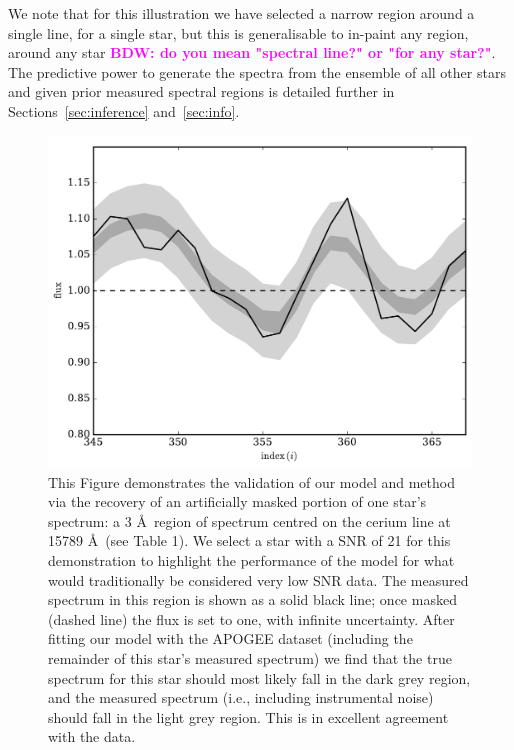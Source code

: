 \documentclass[a4paper,fleqn,usenatbib]{mnras}
\newcommand{\bdw}[1]{\textbf{\textcolor{magenta}{BDW: #1}}}
\begin{document}
We note that for this illustration we have selected a narrow region around a single line, for a single star, but this is generalisable to in-paint any region, around any star \bdw{do you mean "spectral line?" or "for any star?"}. The predictive power to generate the spectra from the ensemble of all other stars and given prior measured spectral regions is detailed further in Sections~\ref{sec:inference} and~\ref{sec:info}. 


\begin{figure}
	\includegraphics[width=\columnwidth]{apogee_centers_final_29502_spc_rec_test_recovery_zoom.pdf}
    \caption{This Figure demonstrates the validation of our model and method via the recovery of an artificially masked portion of one star's spectrum: a 3 \AA\ region of spectrum centred on the cerium line at 15789 \AA\ (see Table 1). We select a star with a SNR of 21 for this demonstration to highlight the performance of the model for what would traditionally be considered very low SNR data. The measured spectrum in this region is shown as a solid black line; once masked (dashed line) the flux is set to one, with infinite uncertainty. After fitting our model with the APOGEE dataset (including the remainder of this star's measured spectrum) we find that the true spectrum for this star should most likely fall in the dark grey region, and the measured spectrum (i.e., including instrumental noise) should fall in the light grey region. This is in excellent agreement with the data.}
    \label{fig:recovery_test}
\end{figure}
\end{document}
